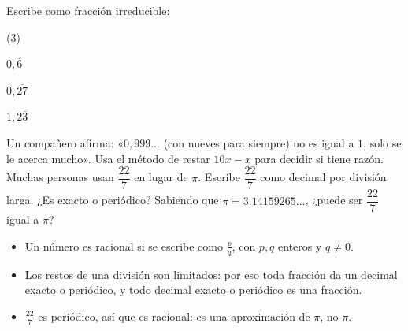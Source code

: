 \documentclass[11pt]{article}
\begin{document}
\begin{preguntas}
\pregunta Escribe como fracción irreducible:
\begin{opciones*}(3)
  \item $0{,}\overline{6}$
  \item $0{,}\overline{27}$
  \item $1{,}2\overline{3}$
\end{opciones*}
\espacio{3cm}
\pregunta Un compañero afirma: «$0{,}999\ldots$ (con nueves para siempre)
no es igual a $1$, solo se le acerca mucho». Usa el método de restar
$10x - x$ para decidir si tiene razón.
\espacio{3cm}
\pregunta Muchas personas usan $\dfrac{22}{7}$ en lugar de $\pi$. Escribe
$\dfrac{22}{7}$ como decimal por división larga. ¿Es exacto o periódico?
Sabiendo que $\pi = \num{3,14159265}\ldots$, ¿puede ser $\dfrac{22}{7}$
igual a $\pi$?
\espacio{3cm}
\end{preguntas}

\begin{resumen}
\begin{itemize}
  \item Un número es racional si se escribe como $\frac{p}{q}$, con $p, q$
        enteros y $q \neq 0$.
  \item Los restos de una división son limitados: por eso toda fracción da un
        decimal exacto o periódico, y todo decimal exacto o periódico es una
        fracción.
  \item $\frac{22}{7}$ es periódico, así que es racional: es una aproximación
        de $\pi$, no $\pi$.
\end{itemize}
\end{resumen}

\label{tema:escandalopitagorico}
\end{document}
